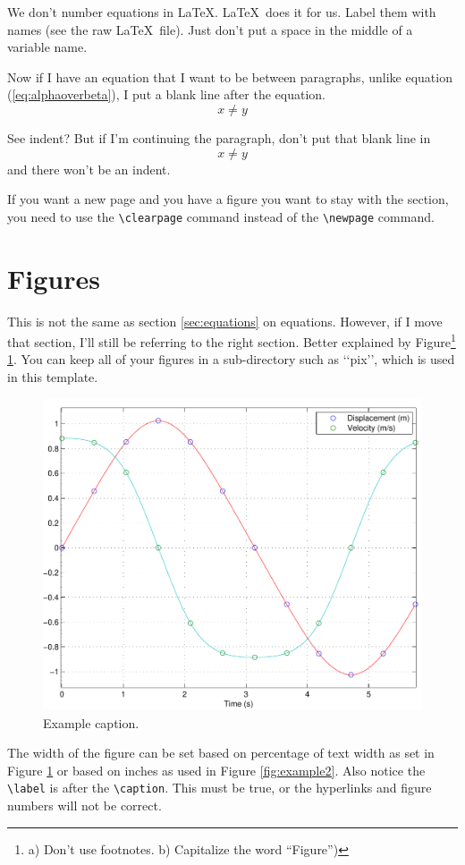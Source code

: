 \documentclass[12pt]{report}
\begin{document}
We don't number equations in \LaTeX. \LaTeX\ does it for us. Label them with names (see the raw \LaTeX\ file).   Just don't put a space in the middle of a variable name. 

Now if I have an equation that I want to be between paragraphs, unlike equation (\ref{eq:alphaoverbeta}), I put a blank line after the equation.
\begin{equation}
  \label{eq:anothersillyequation}
  x\neq y
\end{equation}

See  indent? But if I'm continuing the paragraph, don't put that blank line in
\begin{equation}
  \label{eq:anothersillyequation2}
  x\neq y
\end{equation}
and there won\rq{}t be an indent.

If you want a new page and you have a figure you want to stay with the section, you need to use the \verb'\clearpage' command instead of the \verb'\newpage' command.  

\section{Figures}
This is not the same as section \ref{sec:equations} on equations. However, if I move that section, I'll still be referring to the right section. 
 Better explained by Figure\footnote{a) Don't use footnotes. b) Capitalize the word ``Figure'')} \ref{fig:example}.  You can keep all of your figures in a sub-directory such as \lq\lq{}pix\rq\rq{}, which is used in this template.
\begin{figure}[htbp] %
   \centering
   \includegraphics[width=.5\textwidth]{pix/example} %
   \caption{Example caption.}
   \label{fig:example}
\end{figure}

The width of the figure can be set based on percentage of text width as set in Figure \ref{fig:example} or based on inches as used in Figure \ref{fig:example2}.  Also notice the \verb'\label' is after the \verb'\caption'.  This must be true, or the hyperlinks and figure numbers will not be correct.
\end{document}
